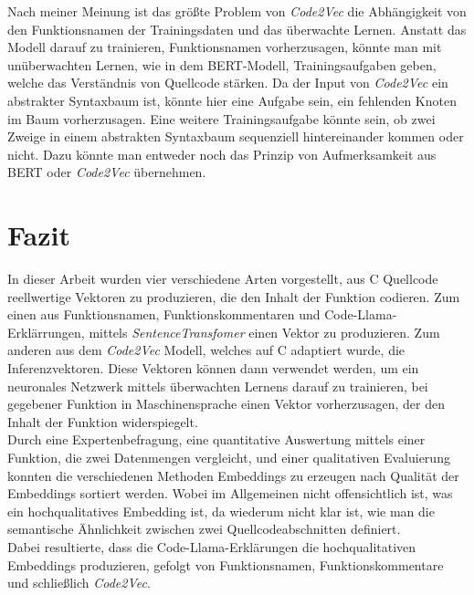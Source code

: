 \documentclass[12pt,letterpaper,ngerman]{article}
\begin{document}
Nach meiner Meinung ist das größte Problem von \textit{Code2Vec} 
die Abhängigkeit von den Funktionsnamen der Trainingsdaten und 
das überwachte Lernen. Anstatt das Modell darauf zu trainieren,
Funktionsnamen vorherzusagen, könnte man mit unüberwachten Lernen,
wie in dem BERT-Modell, Trainingsaufgaben geben, welche das 
Verständnis von Quellcode stärken. Da der Input von 
\textit{Code2Vec} ein abstrakter Syntaxbaum ist, könnte hier eine 
Aufgabe sein, ein fehlenden Knoten im Baum vorherzusagen. Eine 
weitere Trainingsaufgabe könnte sein, ob zwei Zweige in 
einem abstrakten Syntaxbaum sequenziell hintereinander kommen oder 
nicht. Dazu könnte man entweder noch das Prinzip von Aufmerksamkeit aus 
BERT oder \textit{Code2Vec} übernehmen.
\pagebreak
\section{Fazit}
In dieser Arbeit wurden vier verschiedene Arten vorgestellt,
aus C Quellcode reellwertige Vektoren zu produzieren, die den 
Inhalt der Funktion codieren. Zum einen aus Funktionsnamen, 
Funktionskommentaren und Code-Llama-Erklärrungen, mittels 
\textit{SentenceTransfomer} einen Vektor zu produzieren.
Zum anderen aus dem \textit{Code2Vec} Modell, welches auf C
adaptiert wurde, die Inferenzvektoren. Diese Vektoren können dann 
verwendet werden, um ein neuronales Netzwerk mittels überwachten 
Lernens darauf zu trainieren, bei gegebener Funktion in 
Maschinensprache einen Vektor vorherzusagen, der den Inhalt der 
Funktion widerspiegelt.\\
Durch eine Expertenbefragung, eine quantitative Auswertung 
mittels einer Funktion, die zwei Datenmengen vergleicht,
und einer qualitativen Evaluierung konnten die verschiedenen 
Methoden Embeddings zu erzeugen nach Qualität der Embeddings 
sortiert werden.
Wobei im Allgemeinen nicht offensichtlich ist, was ein 
hochqualitatives Embedding ist, da wiederum nicht klar ist,
wie man die semantische Ähnlichkeit zwischen zwei 
Quellcodeabschnitten definiert.\\
Dabei resultierte, dass die Code-Llama-Erklärungen die 
hochqualitativen Embeddings produzieren, 
gefolgt von Funktionsnamen, Funktionskommentare 
und schließlich \textit{Code2Vec}.
\pagebreak

\pagestyle{fancy}



\nocite{*} %
\end{document}
